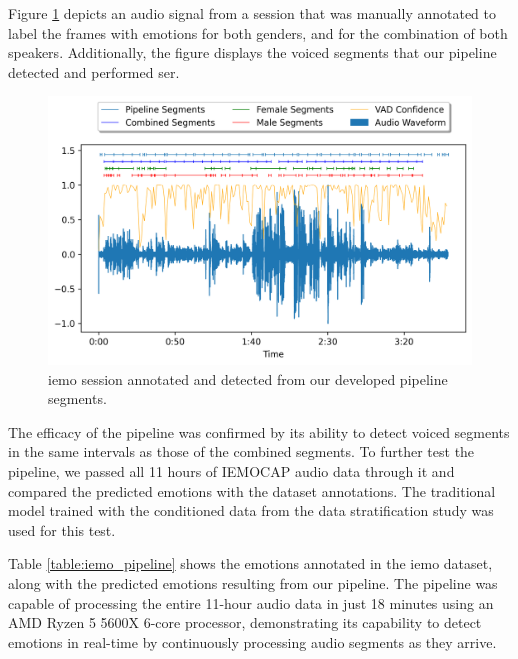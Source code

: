 Figure \ref{fig:iemo_pipeline} depicts an audio signal from a session that was manually annotated to label the frames with emotions for both genders, and for the combination of both speakers. Additionally, the figure displays the voiced segments that our pipeline detected and performed \ac{ser}.

\begin{figure}[H]
	\centering
	\includegraphics[width=\textwidth]{figs/6_video_conf_ser/pipeline.png}
	\caption{\ac{iemo} session annotated and detected from our developed pipeline segments.}
	\label{fig:iemo_pipeline}
\end{figure}

The efficacy of the pipeline was confirmed by its ability to detect voiced segments in the same intervals as those of the combined segments. To further test the pipeline, we passed all 11 hours of IEMOCAP audio data through it and compared the predicted emotions with the dataset annotations. The traditional model trained with the conditioned data from the data stratification study was used for this test.

Table \ref{table:iemo_pipeline} shows the emotions annotated in the \ac{iemo} dataset, along with the predicted emotions resulting from our pipeline. The pipeline was capable of processing the entire 11-hour audio data in just 18 minutes using an AMD Ryzen 5 5600X 6-core processor, demonstrating its capability to detect emotions in real-time by continuously processing audio segments as they arrive.

